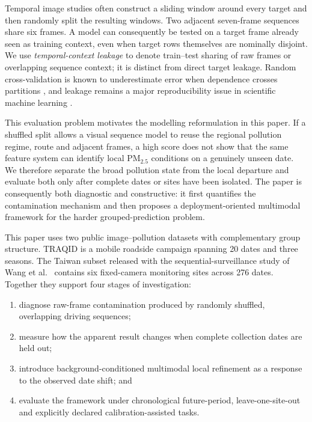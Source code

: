 \documentclass[review,12pt,authoryear]{elsarticle}
\newcommand{\PM}[1]{\ensuremath{\mathrm{PM}_{#1}}}
\newcommand{\pmfine}{\PM{2.5}}
\begin{document}
Temporal image studies often construct a sliding window around every target and
then randomly split the resulting windows. Two adjacent seven-frame sequences
share six frames. A model can consequently be tested on a target frame already
seen as training context, even when target rows themselves are nominally
disjoint. We use \emph{temporal-context leakage} to denote train--test sharing
of raw frames or overlapping sequence context; it is distinct from direct
target leakage. Random cross-validation is known to underestimate error
when dependence crosses partitions \citep{roberts2017cv}, and leakage remains a
major reproducibility issue in scientific machine learning
\citep{kapoor2023leakage}.

This evaluation problem motivates the modelling reformulation in this paper.
If a shuffled split allows a visual sequence model to reuse the regional
pollution regime, route and adjacent frames, a high score does not show that the
same feature system can identify local \pmfine{} conditions on a genuinely
unseen date. We therefore separate the broad pollution state from the local
departure and evaluate both only after complete dates or sites have been
isolated. The paper is consequently both diagnostic and constructive: it first
quantifies the contamination mechanism and then proposes a deployment-oriented
multimodal framework for the harder grouped-prediction problem.

This paper uses two public image--pollution datasets with complementary group
structure. TRAQID \citep{kathalkar2024traqid} is a mobile roadside campaign
spanning 20 dates and three seasons. The Taiwan subset released with the
sequential-surveillance study of Wang et al.~\citep{wang2026unified} contains
six fixed-camera monitoring sites across 276 dates. Together they support four
stages of investigation:
\begin{enumerate}
  \item diagnose raw-frame contamination produced by randomly shuffled,
        overlapping driving sequences;
  \item measure how the apparent result changes when complete collection dates
        are held out;
  \item introduce background-conditioned multimodal local refinement as a
        response to the observed date shift; and
  \item evaluate the framework under chronological future-period,
        leave-one-site-out and explicitly declared calibration-assisted tasks.
\end{enumerate}
\end{document}
